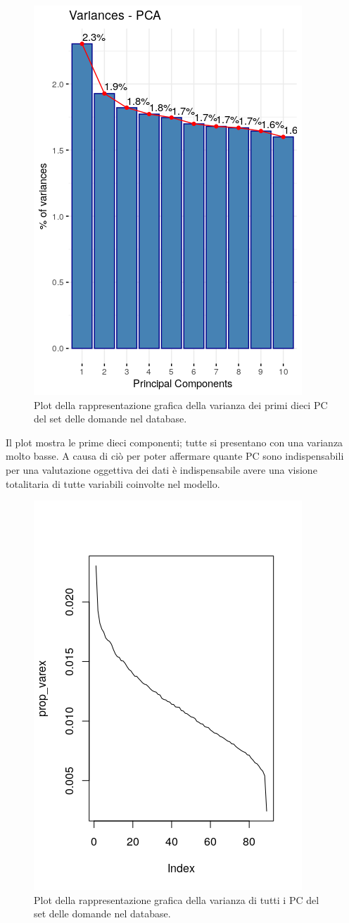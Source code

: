 \begin{figure}[H]
\centering
	\includegraphics[width=0.60\linewidth]{../../PCA/plot/variances_rete-db.png}
	\caption{Plot della rappresentazione grafica della varianza dei primi dieci PC del set delle domande nel database.}
	\label{Plot della rappresentazione grafica della varianza dei primi dieci PC del set delle domande nel database.}
\end{figure}
\noindent
Il plot mostra le prime dieci componenti; tutte si presentano con una varianza molto basse. A causa di ci\`o per poter affermare quante PC sono indispensabili per una valutazione oggettiva dei dati \`e indispensabile avere una visione totalitaria di tutte variabili coinvolte nel modello.
\begin{figure}[H]
\centering
	\includegraphics[width=0.60\linewidth]{../../PCA/plot/variances-ALL_rete-db.png}
	\caption{Plot della rappresentazione grafica della varianza di tutti i PC del set delle domande nel database.}
	\label{Plot della rappresentazione grafica della varianza di tutti i PC del set delle domande nel database.}
\end{figure}
